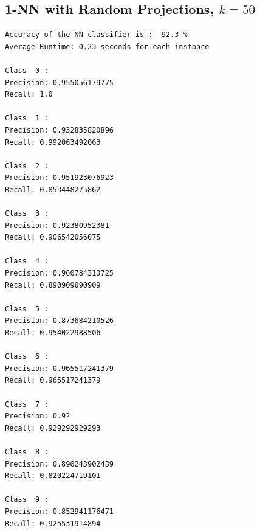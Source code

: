 \subsection*{1-NN with Random Projections, $k=50$}

\begin{lstlisting}[frame=single]
Accuracy of the NN classifier is :  92.3 %
Average Runtime: 0.23 seconds for each instance

Class  0 :
Precision: 0.955056179775
Recall: 1.0

Class  1 :
Precision: 0.932835820896
Recall: 0.992063492063

Class  2 :
Precision: 0.951923076923
Recall: 0.853448275862

Class  3 :
Precision: 0.92380952381
Recall: 0.906542056075

Class  4 :
Precision: 0.960784313725
Recall: 0.890909090909

Class  5 :
Precision: 0.873684210526
Recall: 0.954022988506

Class  6 :
Precision: 0.965517241379
Recall: 0.965517241379

Class  7 :
Precision: 0.92
Recall: 0.929292929293

Class  8 :
Precision: 0.890243902439
Recall: 0.820224719101

Class  9 :
Precision: 0.852941176471
Recall: 0.925531914894

\end{lstlisting}

